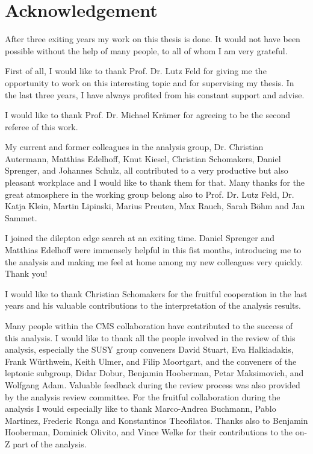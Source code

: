 \chapter*{Acknowledgement}
After three exiting years my work on this thesis is done. It would not have been possible without the help of many people, to all of whom I am very grateful. 

First of all, I would like to thank Prof. Dr. Lutz Feld for giving me the opportunity to work on this interesting topic and for supervising my thesis. In the last three years, I have always profited from his constant support and advise.

I would like to thank Prof. Dr. Michael Kr\"amer for agreeing to be the second referee of this work. 

My current and former colleagues in the analysis group, Dr. Christian Autermann, Matthias Edelhoff, Knut Kiesel, Christian Schomakers, Daniel Sprenger, and Johannes Schulz, all contributed to a very productive but also pleasant workplace and I would like to thank them for that. Many thanks for the great atmosphere in the working group belong also to Prof. Dr. Lutz Feld, Dr. Katja Klein, Martin Lipinski, Marius Preuten, Max Rauch, Sarah B\"ohm and Jan Sammet.  

I joined the dilepton edge search at an exiting time. Daniel Sprenger and Matthias Edelhoff were immensely helpful in this fist months, introducing me to the analysis and making me feel at home among my new colleagues very quickly. Thank you!  

I would like to thank Christian Schomakers for the fruitful cooperation in the last years and his valuable contributions to the interpretation of the analysis results.  

Many people within the CMS collaboration have contributed to the success of this analysis. I would like to thank all the people involved in the review of this analysis, especially the SUSY group conveners David Stuart, Eva Halkiadakis, Frank W\"urthwein, Keith Ulmer, and Filip Moortgart, and the conveners of the leptonic subgroup, Didar Dobur, Benjamin Hooberman, Petar Maksimovich, and Wolfgang Adam. Valuable feedback during the review process was also provided by the analysis review committee. For the fruitful collaboration during the analysis I would especially like to thank Marco-Andrea Buchmann, Pablo Martinez, Frederic Ronga and Konstantinos Theofilatos. Thanks also to Benjamin Hooberman, Dominick Olivito, and Vince Welke for their contributions to the on-Z part of the analysis. 

